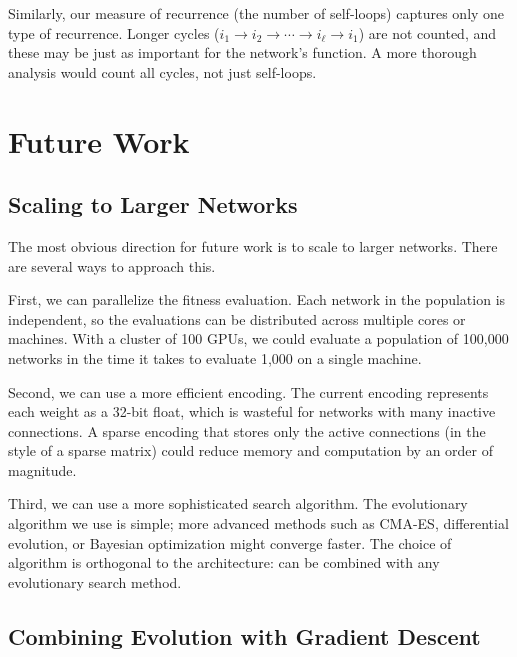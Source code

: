 Similarly, our measure of recurrence (the number of self-loops)
captures only one type of recurrence. Longer cycles
($i_1 \to i_2 \to \cdots \to i_\ell \to i_1$) are not counted, and
these may be just as important for the network's function. A more
thorough analysis would count all cycles, not just self-loops.

\section{Future Work}
\label{sec:future}

\subsection{Scaling to Larger Networks}
\label{sec:future-scale}

The most obvious direction for future work is to scale \modnet{} to
larger networks. There are several ways to approach this.

First, we can parallelize the fitness evaluation. Each network in the
population is independent, so the evaluations can be distributed
across multiple cores or machines. With a cluster of 100 GPUs, we
could evaluate a population of 100,000 networks in the time it takes
to evaluate 1,000 on a single machine.

Second, we can use a more efficient encoding. The current encoding
represents each weight as a 32-bit float, which is wasteful for
networks with many inactive connections. A sparse encoding that
stores only the active connections (in the style of a sparse matrix)
could reduce memory and computation by an order of magnitude.

Third, we can use a more sophisticated search algorithm. The
evolutionary algorithm we use is simple; more advanced methods such
as CMA-ES, differential evolution, or Bayesian optimization might
converge faster. The choice of algorithm is orthogonal to the
architecture: \modnet{} can be combined with any evolutionary search
method.

\subsection{Combining Evolution with Gradient Descent}
\label{sec:future-hybrid}

